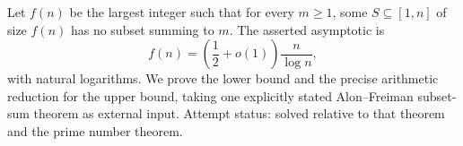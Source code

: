Let \(f(n)\) be the largest integer such that for every \(m\geq1\), some \(S\subseteq[1,n]\) of size \(f(n)\) has no subset summing to \(m\). The asserted asymptotic is
\[
f(n)=\left(\frac12+o(1)\right)\frac n{\log n},
\]
with natural logarithms. We prove the lower bound and the precise arithmetic reduction for the upper bound, taking one explicitly stated Alon--Freiman subset-sum theorem as external input. Attempt status: solved relative to that theorem and the prime number theorem.
